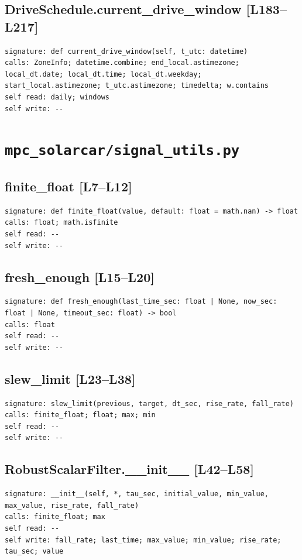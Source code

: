 \documentclass[a4paper,10pt,oneside]{book}
\begin{document}
\subsection*{DriveSchedule.current\_drive\_window [L183--L217]}
\begin{lstlisting}[numbers=none]
signature: def current_drive_window(self, t_utc: datetime)
calls: ZoneInfo; datetime.combine; end_local.astimezone; local_dt.date; local_dt.time; local_dt.weekday; start_local.astimezone; t_utc.astimezone; timedelta; w.contains
self read: daily; windows
self write: --
\end{lstlisting}
\section{\texttt{mpc\_solarcar/signal\_utils.py}}
\subsection*{finite\_float [L7--L12]}
\begin{lstlisting}[numbers=none]
signature: def finite_float(value, default: float = math.nan) -> float
calls: float; math.isfinite
self read: --
self write: --
\end{lstlisting}
\subsection*{fresh\_enough [L15--L20]}
\begin{lstlisting}[numbers=none]
signature: def fresh_enough(last_time_sec: float | None, now_sec: float | None, timeout_sec: float) -> bool
calls: float
self read: --
self write: --
\end{lstlisting}
\subsection*{slew\_limit [L23--L38]}
\begin{lstlisting}[numbers=none]
signature: slew_limit(previous, target, dt_sec, rise_rate, fall_rate)
calls: finite_float; float; max; min
self read: --
self write: --
\end{lstlisting}
\subsection*{RobustScalarFilter.\_\_init\_\_ [L42--L58]}
\begin{lstlisting}[numbers=none]
signature: __init__(self, *, tau_sec, initial_value, min_value, max_value, rise_rate, fall_rate)
calls: finite_float; max
self read: --
self write: fall_rate; last_time; max_value; min_value; rise_rate; tau_sec; value
\end{lstlisting}
\end{document}
